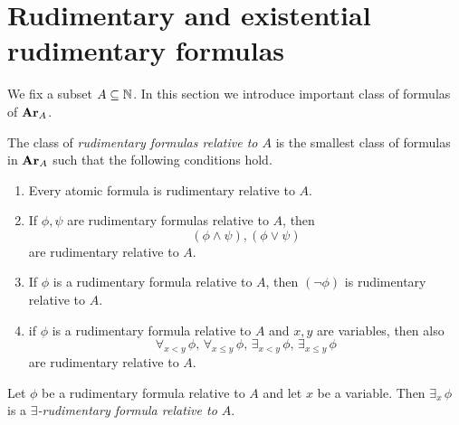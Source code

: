 \documentclass[10pt]{amsart}
\begin{document}
\section{Rudimentary and existential rudimentary formulas}
\noindent
We fix a subset $A \subseteq {\mathbb N}$. In this section we introduce important class of formulas of $\mathbf{Ar}_A$.

\begin{definition}
	The class of \textit{rudimentary formulas relative to $A$} is the smallest class of formulas in $\mathbf{Ar}_A$ such that the following conditions hold.
	\begin{enumerate}[label=\textbf{(\arabic*)}, leftmargin=3.0em]
		\item Every atomic formula is rudimentary relative to $A$.
		\item If $\phi,\psi$ are rudimentary formulas relative to $A$, then
		      $$\left(\phi \wedge \psi\right),\left(\phi \vee \psi\right)$$
		      are rudimentary relative to $A$.
		\item If $\phi$ is a rudimentary formula relative to $A$, then $\left(\neg \phi\right)$ is rudimentary relative to $A$.
		\item if $\phi$ is a rudimentary formula relative to $A$ and $x,y$ are variables, then also
		      $$\forall_{x < y}\,\phi,\,\forall_{x \leq y}\,\phi,\,\exists_{x < y}\,\phi,\,\exists_{x \leq y}\,\phi$$
		      are rudimentary relative to $A$.
	\end{enumerate}
\end{definition}

\begin{definition}
	Let $\phi$ be a rudimentary formula relative to $A$ and let $x$ be a variable. Then $\exists_x\,\phi$ is a \textit{$\exists$-rudimentary formula relative to $A$}.
\end{definition}
\end{document}
